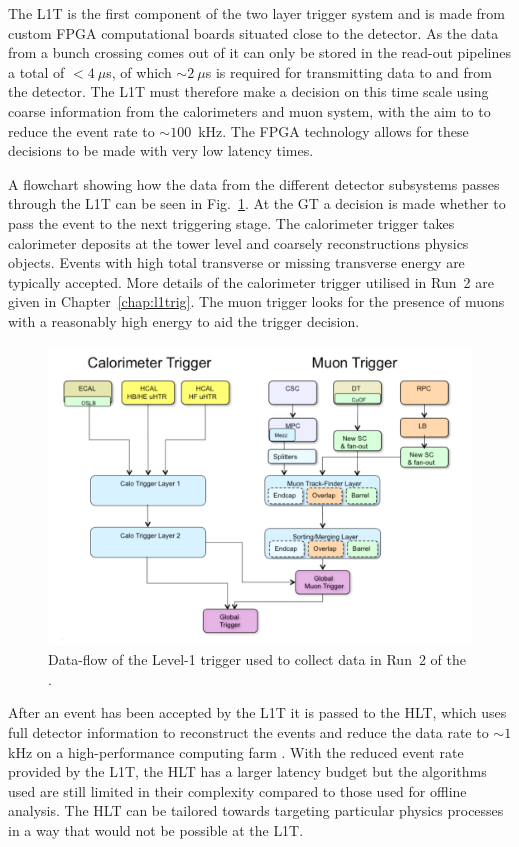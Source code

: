 The \ac{L1T} is the first component of the two layer trigger system
and is made from custom \ac{FPGA} computational boards situated close
to the detector.  As the data from a bunch crossing comes out of \CMS
it can only be stored in the read-out pipelines a total of $<4~\mu$s,
of which $\sim2~\mu$s is required for transmitting data to and from
the detector. The \ac{L1T} must therefore make a decision on this time
scale using coarse information from the calorimeters and muon system,
with the aim to to reduce the event rate to $\sim100$~kHz. The
\ac{FPGA} technology allows for these decisions to be made with very
low latency times.

A flowchart showing how the data from the different detector
subsystems passes through the \ac{L1T} can be seen in
Fig.~\ref{fig:l1t}. At the \ac{GT} a decision is made whether to
pass the event to the next triggering stage. The calorimeter trigger
takes calorimeter deposits at the tower level and coarsely
reconstructions physics objects. Events with high total transverse or
missing transverse energy are typically accepted.  More details of the
calorimeter trigger utilised in Run~2 are given in
Chapter~\ref{chap:l1trig}. The muon trigger looks for the presence of
muons with a reasonably high energy to aid the trigger decision.

\begin{figure}
\begin{center}
\includegraphics[width=0.8\linewidth]{figs/cms_triggerflowchart} \end{center}
\caption{ Data-flow of the Level-1 trigger used to collect data in Run~2 of the
\LHC \cite{Tapper:1556311}.}
\label{fig:l1t} \end{figure}

After an event has been accepted by the \ac{L1T} it is passed to the
\ac{HLT}, which uses full detector information to reconstruct the
events and reduce the data rate to $\sim1$kHz on a high-performance
computing farm \cite{Cittolin:578006}.  With the reduced event rate
provided by the \ac{L1T}, the \ac{HLT} has a larger latency budget but
the algorithms used are still limited in their complexity compared to
those used for offline analysis. The \ac{HLT} can be tailored
towards targeting particular physics processes in a way that would not
be possible at the \ac{L1T}.


